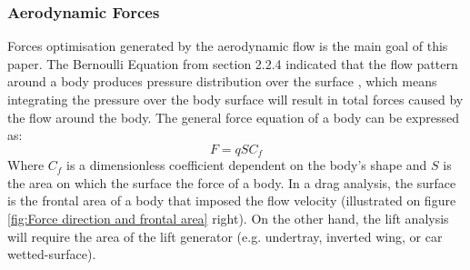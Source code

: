 \subsubsection{Aerodynamic Forces}
Forces optimisation generated by the aerodynamic flow is the main goal of this paper. The Bernoulli Equation from section 2.2.4 indicated that the flow pattern around a body produces pressure distribution over the surface \cite{Scibor-Rylski1984RoadAerodynamics}, which means integrating the pressure over the body surface will result in total forces caused by the flow around the body. The general force equation of a body can be expressed as:
\begin{equation}
    F = qSC_f
\end{equation}
Where $C_f$ is a dimensionless coefficient dependent on the body's shape \cite{Scibor-Rylski1984RoadAerodynamics} and $S$ is the area on which the surface the force of a body. In a drag analysis, the surface is the frontal area of a body that imposed the flow velocity (illustrated on figure \ref{fig:Force direction and frontal area} right). On the other hand, the lift analysis will require the area of the lift generator (e.g. undertray, inverted wing, or car wetted-surface).

